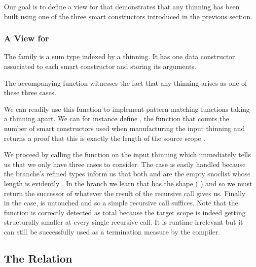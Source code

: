Our goal is to define a view for  that demonstrates
that any thinning has been built using one of the three smart
constructors introduced in the previous section.

\subsubsection{A View for }

The  family is a sum type indexed by a thinning. It has one
data constructor associated to each smart constructor and storing its arguments.


The accompanying  function witnesses the fact that any
thinning arises as one of these three cases.


We can readily use this function to implement pattern matching functions taking
a thinning apart. We can for instance define , the function
that counts the number of  smart constructors used when
manufacturing the input thinning and returns a proof that this is exactly the
length of the source scope .


We proceed by calling the  function on the input thinning
which immediately tells us that we only have three cases to consider.
%
The  case is easily handled because the branche's refined
types inform us that both  and  are the
empty snoclist \IdrisData{[<]} whose length is evidently .
%
In the  branch we learn that  has the shape
(\IdrisBound{\KatlaUnderscore} \IdrisData{:<} ) and so we must return the
successor of whatever the result of the recursive call gives us.
%
Finally in the  case,  is untouched and so a
simple recursive call suffices.
%
Note that the function is correctly detected as total because the target scope
 is indeed getting structurally smaller at every single recursive
call.
%
It is runtime irrelevant but it can still be successfully used as a termination
measure by the compiler.

\subsection{The  Relation}

